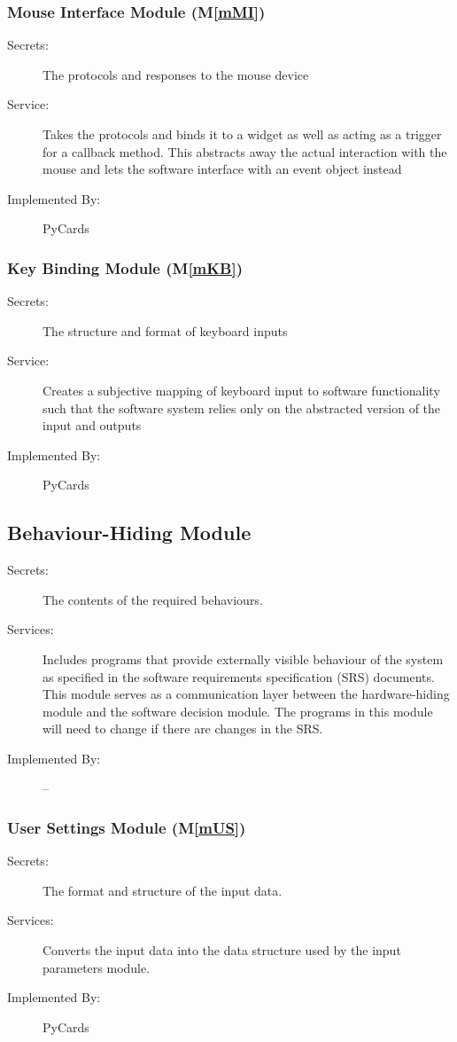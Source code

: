 \documentclass[12pt, titlepage]{article}
\newcommand{\mref}[1]{M\ref{#1}}
\begin{document}
	\subsubsection{Mouse Interface Module (\mref{mMI})}
	\begin{description}
		\item[Secrets:]The protocols and responses to the mouse device
		\item[Service:]Takes the protocols and binds it to a widget as well as 
		acting as a trigger for a callback method. This abstracts away the 
		actual interaction with the mouse and lets the software interface with 
		an event object instead
		\item[Implemented By:] PyCards
	\end{description}
	\subsubsection{Key Binding Module (\mref{mKB})}
	\begin{description}
		\item[Secrets:]The structure and format of keyboard inputs
		\item[Service:]Creates a subjective mapping of keyboard input to 
		software functionality such that the software system relies only on the 
		abstracted version of the input and outputs
		\item[Implemented By:] PyCards
	\end{description}
	\subsection{Behaviour-Hiding Module}
	\begin{description}
		\item[Secrets:]The contents of the required behaviours.
		\item[Services:]Includes programs that provide externally visible 
		behaviour of the system as specified in the software requirements 
		specification (SRS) documents. This module serves as a communication 
		layer between the hardware-hiding module and the software decision 
		module. The programs in this module will need to change if there are 
		changes in the SRS.
		\item[Implemented By:] --
	\end{description}
	\subsubsection{User Settings Module (\mref{mUS})}
	\begin{description}
		\item[Secrets:]The format and structure of the input data.
		\item[Services:]Converts the input data into the data structure used by 
		the input parameters module.
		\item[Implemented By:] PyCards
	\end{description}
\end{document}
